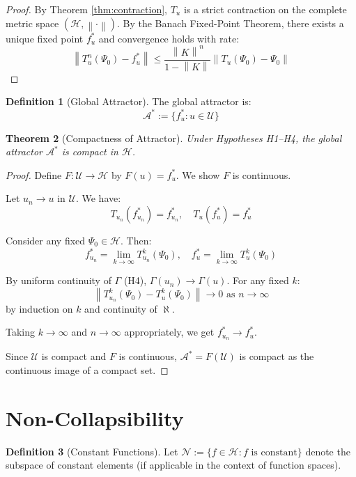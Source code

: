 \documentclass[11pt,a4paper]{article}
\theoremstyle{plain}
\newtheorem{theorem}{Theorem}[section]
\theoremstyle{definition}
\newtheorem{definition}[theorem]{Definition}
\newcommand{\Hilb}{\mathcal{H}}
\newcommand{\U}{\mathcal{U}}
\newcommand{\A}{\mathcal{A}}
\newcommand{\norm}[1]{\left\lVert #1 \right\rVert}
\begin{document}
\begin{proof}
By Theorem \ref{thm:contraction}, $T_u$ is a strict contraction on the complete metric space $(\Hilb, \norm{\cdot})$. By the Banach Fixed-Point Theorem, there exists a unique fixed point $f^*_u$ and convergence holds with rate:
\[
\norm{T_u^n(\Psi_0) - f^*_u} \leq \frac{\norm{K}^n}{1 - \norm{K}} \norm{T_u(\Psi_0) - \Psi_0}
\]
\end{proof}

\begin{definition}[Global Attractor]\label{def:attractor}
The global attractor is:
\[
\A^* := \{f^*_u : u \in \U\}
\]
\end{definition}

\begin{theorem}[Compactness of Attractor]\label{thm:compactness}
Under Hypotheses H1--H4, the global attractor $\A^*$ is compact in $\Hilb$.
\end{theorem}

\begin{proof}
Define $F: \U \to \Hilb$ by $F(u) = f^*_u$. We show $F$ is continuous.

Let $u_n \to u$ in $\U$. We have:
\[
T_{u_n}(f^*_{u_n}) = f^*_{u_n}, \quad T_u(f^*_u) = f^*_u
\]

Consider any fixed $\Psi_0 \in \Hilb$. Then:
\[
f^*_{u_n} = \lim_{k \to \infty} T_{u_n}^k(\Psi_0), \quad f^*_u = \lim_{k \to \infty} T_u^k(\Psi_0)
\]

By uniform continuity of $\Gamma$ (H4), $\Gamma(u_n) \to \Gamma(u)$. For any fixed $k$:
\[
\norm{T_{u_n}^k(\Psi_0) - T_u^k(\Psi_0)} \to 0 \text{ as } n \to \infty
\]
by induction on $k$ and continuity of $\aleph$.

Taking $k \to \infty$ and $n \to \infty$ appropriately, we get $f^*_{u_n} \to f^*_u$.

Since $\U$ is compact and $F$ is continuous, $\A^* = F(\U)$ is compact as the continuous image of a compact set.
\end{proof}

\section{Non-Collapsibility}

\begin{definition}[Constant Functions]
Let $\mathcal{N} := \{f \in \Hilb : f \text{ is constant}\}$ denote the subspace of constant elements (if applicable in the context of function spaces).
\end{definition}
\end{document}
